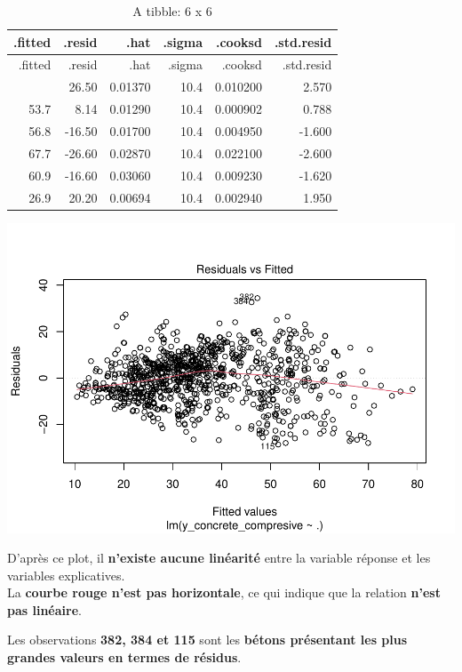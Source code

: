 \documentclass[
  12pt,
]{article}
\begin{document}
\begin{longtable}[]{@{}rrrrrr@{}}
\caption{A tibble: 6 x 6}\tabularnewline
\toprule\noalign{}
.fitted & .resid & .hat & .sigma & .cooksd & .std.resid \\
\midrule\noalign{}
\endfirsthead
\toprule\noalign{}
.fitted & .resid & .hat & .sigma & .cooksd & .std.resid \\
\midrule\noalign{}
\endhead
\bottomrule\noalign{}
\endlastfoot
53.5 & 26.50 & 0.01370 & 10.4 & 0.010200 & 2.570 \\
53.7 & 8.14 & 0.01290 & 10.4 & 0.000902 & 0.788 \\
56.8 & -16.50 & 0.01700 & 10.4 & 0.004950 & -1.600 \\
67.7 & -26.60 & 0.02870 & 10.4 & 0.022100 & -2.600 \\
60.9 & -16.60 & 0.03060 & 10.4 & 0.009230 & -1.620 \\
26.9 & 20.20 & 0.00694 & 10.4 & 0.002940 & 1.950 \\
\end{longtable}

\includegraphics{rmd_final_files/figure-latex/unnamed-chunk-18-1.pdf}

D'après ce plot, il \textbf{n'existe aucune linéarité} entre la variable
réponse et les variables explicatives.\\
La \textbf{courbe rouge n'est pas horizontale}, ce qui indique que la
relation \textbf{n'est pas linéaire}.

Les observations \textbf{382, 384 et 115} sont les \textbf{bétons
présentant les plus grandes valeurs en termes de résidus}.
\end{document}
